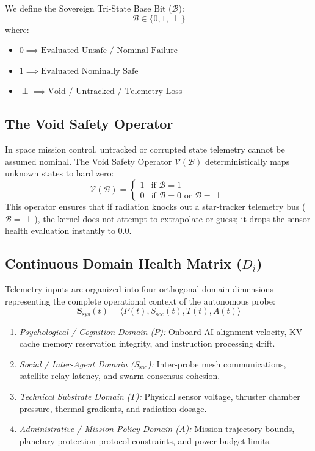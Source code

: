 \documentclass[journal]{IEEEtran}
\begin{document}
We define the Sovereign Tri-State Base Bit ($\mathcal{B}$):
\begin{equation}
\mathcal{B} \in \{0, 1, \perp\}
\end{equation}
where:
\begin{itemize}
    \item $0 \implies \text{Evaluated Unsafe / Nominal Failure}$
    \item $1 \implies \text{Evaluated Nominally Safe}$
    \item $\perp \implies \text{Void / Untracked / Telemetry Loss}$
\end{itemize}

\subsection{The Void Safety Operator}
In space mission control, untracked or corrupted state telemetry cannot be assumed nominal. The Void Safety Operator $\mathcal{V}(\mathcal{B})$ deterministically maps unknown states to hard zero:
\begin{equation}
\mathcal{V}(\mathcal{B}) = \begin{cases} 1 & \text{if } \mathcal{B} = 1 \\ 0 & \text{if } \mathcal{B} = 0 \text{ or } \mathcal{B} = \perp \end{cases}
\end{equation}
This operator ensures that if radiation knocks out a star-tracker telemetry bus ($\mathcal{B} = \perp$), the kernel does not attempt to extrapolate or guess; it drops the sensor health evaluation instantly to $0.0$.

\subsection{Continuous Domain Health Matrix ($D_i$)}
Telemetry inputs are organized into four orthogonal domain dimensions representing the complete operational context of the autonomous probe:
\begin{equation}
\mathbf{S}_{\text{sys}}(t) = \langle P(t), S_{\text{soc}}(t), T(t), A(t) \rangle
\end{equation}
\begin{enumerate}
    \item \emph{Psychological / Cognition Domain ($P$):} Onboard AI alignment velocity, KV-cache memory reservation integrity, and instruction processing drift.
    \item \emph{Social / Inter-Agent Domain ($S_{\text{soc}}$):} Inter-probe mesh communications, satellite relay latency, and swarm consensus cohesion.
    \item \emph{Technical Substrate Domain ($T$):} Physical sensor voltage, thruster chamber pressure, thermal gradients, and radiation dosage.
    \item \emph{Administrative / Mission Policy Domain ($A$):} Mission trajectory bounds, planetary protection protocol constraints, and power budget limits.
\end{enumerate}
\end{document}
